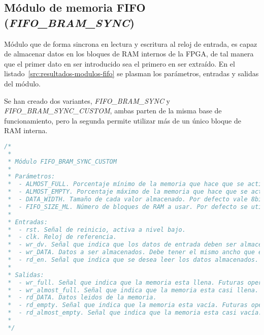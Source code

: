 \subsection{Módulo de memoria FIFO (\emph{FIFO\_BRAM\_SYNC})}
Módulo que de forma sincrona en lectura y escritura al reloj de entrada, es capaz de almacenar datos en los bloques de RAM internos de la FPGA, de tal manera que el primer dato en ser introducido sea el primero en ser extraído. En el listado~\ref{src:resultados-modulos-fifo} se plasman los parámetros, entradas y salidas del módulo.

Se han creado dos variantes, \emph{FIFO\_BRAM\_SYNC} y \emph{FIFO\_BRAM\_SYNC\_CUSTOM}, ambas parten de la misma base de funcionamiento, pero la segunda permite utilizar más de un único bloque de RAM interna.

\begin{lstlisting}[language=Verilog,
    caption={Parámetros, entradas y salidas del módulo FIFO\_BRAM\_SYNC\_CUSTOM.},
    label=src:resultados-modulos-fifo]
/*
 *
 * Módulo FIFO_BRAM_SYNC_CUSTOM
 *
 * Parámetros:
 *  - ALMOST_FULL. Porcentaje mínimo de la memoria que hace que se active la señal wr_almost_full. Por defecto vale 0.9.
 *  - ALMOST_EMPTY. Porcentaje máximo de la memoria que hace que se active la señal rd_almost_empty. Por defecto vale 0.1.
 *  - DATA_WIDTH. Tamaño de cada valor almacenado. Por defecto vale 8bits.
 *  - FIFO_SIZE_ML. Número de bloques de RAM a usar. Por defecto se utiliza uno.
 *
 * Entradas:
 *  - rst. Señal de reinicio, activa a nivel bajo.
 *  - clk. Reloj de referencia.
 *  - wr_dv. Señal que indica que los datos de entrada deben ser almacenados.
 *  - wr_DATA. Datos a ser almacenados. Debe tener el mismo ancho que el parámetro DATA_WIDTH.
 *  - rd_en. Señal que indica que se desea leer los datos almacenados.
 *
 * Salidas:
 *  - wr_full. Señal que indica que la memoria esta llena. Futuras operaciones de escritura serán ignoradas.
 *  - wr_almost_full. Señal que indica que la memoria esta casi llena.
 *  - rd_DATA. Datos leidos de la memoria.
 *  - rd_empty. Señal que indica que la memoria esta vacía. Futuras operaciones de lectura serán ignoradas.
 *  - rd_almost_empty. Señal que indica que la memoria esta casi vacía.
 *
 */
\end{lstlisting}

